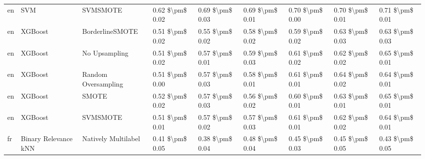 \begin{tabular}{lllllllll}
      en &                             SVM &                      SVMSMOTE & 0.62 \$\textbackslash pm\$ 0.02 &           0.69 \$\textbackslash pm\$ 0.03 &       0.69 \$\textbackslash pm\$ 0.01 &        0.70 \$\textbackslash pm\$ 0.00 &                         0.70 \$\textbackslash pm\$ 0.01 &     0.71 \$\textbackslash pm\$ 0.01 \\
      en &                         XGBoost &               BorderlineSMOTE & 0.51 \$\textbackslash pm\$ 0.02 &           0.55 \$\textbackslash pm\$ 0.02 &       0.58 \$\textbackslash pm\$ 0.02 &        0.59 \$\textbackslash pm\$ 0.02 &                         0.63 \$\textbackslash pm\$ 0.03 &     0.63 \$\textbackslash pm\$ 0.03 \\
      en &                         XGBoost &                 No Upsampling & 0.51 \$\textbackslash pm\$ 0.02 &           0.57 \$\textbackslash pm\$ 0.01 &       0.59 \$\textbackslash pm\$ 0.03 &        0.61 \$\textbackslash pm\$ 0.02 &                         0.62 \$\textbackslash pm\$ 0.02 &     0.65 \$\textbackslash pm\$ 0.01 \\
      en &                         XGBoost &           Random Oversampling & 0.51 \$\textbackslash pm\$ 0.00 &           0.57 \$\textbackslash pm\$ 0.03 &       0.58 \$\textbackslash pm\$ 0.01 &        0.61 \$\textbackslash pm\$ 0.01 &                         0.64 \$\textbackslash pm\$ 0.02 &     0.64 \$\textbackslash pm\$ 0.01 \\
      en &                         XGBoost &                         SMOTE & 0.52 \$\textbackslash pm\$ 0.02 &           0.57 \$\textbackslash pm\$ 0.03 &       0.56 \$\textbackslash pm\$ 0.02 &        0.60 \$\textbackslash pm\$ 0.01 &                         0.63 \$\textbackslash pm\$ 0.01 &     0.65 \$\textbackslash pm\$ 0.01 \\
      en &                         XGBoost &                      SVMSMOTE & 0.51 \$\textbackslash pm\$ 0.01 &           0.57 \$\textbackslash pm\$ 0.02 &       0.57 \$\textbackslash pm\$ 0.03 &        0.61 \$\textbackslash pm\$ 0.01 &                         0.62 \$\textbackslash pm\$ 0.02 &     0.64 \$\textbackslash pm\$ 0.01 \\
      fr &            Binary Relevance kNN &           Natively Multilabel & 0.41 \$\textbackslash pm\$ 0.05 &           0.38 \$\textbackslash pm\$ 0.04 &       0.48 \$\textbackslash pm\$ 0.04 &        0.45 \$\textbackslash pm\$ 0.03 &                         0.45 \$\textbackslash pm\$ 0.05 &     0.43 \$\textbackslash pm\$ 0.05 \\

\end{tabular}
